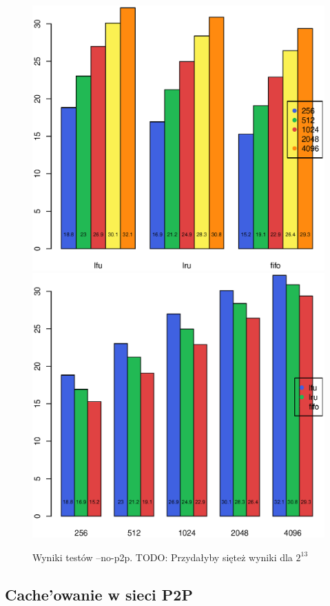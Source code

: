 \documentclass[a4paper,11pt]{scrartcl}
\newcommand{\s}{ }
\newcommand{\Keszowanie}{Cache'owanie}
\begin{document}
\begin{figure}[h]
\centering
\includegraphics[width=0.7\linewidth]{img/nop2p_mean_1.eps}
\includegraphics[width=0.7\linewidth]{img/nop2p_mean_2.eps}
\caption{Wyniki testów --no-p2p. TODO: Przydałyby sięteż wyniki dla $2^{13}$}
\end{figure}



\subsection{\Keszowanie\s w sieci P2P}
\end{document}
